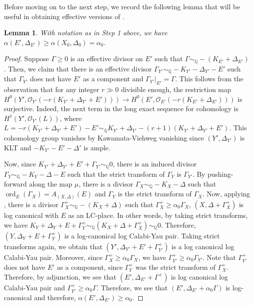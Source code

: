 \documentclass[11pt,reqno]{amsart}
\newcommand{\Q}{\mathbb{Q}}
\newcommand{\cO}{\mathcal{O}}
\DeclareMathOperator{\ord}{ord}
\numberwithin{equation}{section}
\newtheorem{lem}[prop] {Lemma}
\theoremstyle{definition}
\begin{document}
Before moving on to the next step, we record the following lemma that will be useful in obtaining effective versions of .

\begin{lem} \label{lem:alphaofE'}
    With notation as in Step 1 above, we have $\alpha(E', \Delta_{E'}) \geq \alpha (X_0 , \Delta_0) = \alpha_0.$
\end{lem}

\begin{proof}
    Suppose $\Gamma \geq 0$ is an effective divisor on $E'$ such that $\Gamma \sim_\Q - (K_{E'} + \Delta_{E'})$. Then, we claim that there is an effective divisor $\Gamma_{Y'} \sim_{\Q} - K_{Y'} - \Delta_{Y'} - E'$ such that $\Gamma_{Y'}$ does not have $E'$ as a component and $\Gamma_{Y'} |_{E'} = \Gamma $. This follows from the observation that for any integer $r \gg 0$ divisible enough, the restriction map $H^0 (Y', \cO_{Y'} (-r(K_{Y'} + \Delta_{Y'} + E'))) \to H^0 (E', \cO_{E'} (-r(K_{E'} + \Delta_{E'})))  $ is surjective. Indeed, the next term in the long exact sequence for cohomology is $H^1 (Y', \cO_{Y'} (L))$, where $L = -r(K_{Y'} + \Delta_{Y'} + E') - E' \sim_\Q K_{Y'} + \Delta_{Y'} - (r+1) (K_{Y'} + \Delta_{Y'} + E'). $ This cohomology group vanishes by Kawamata-Viehweg vanishing since $(Y', \Delta_{Y'})$ is KLT and $ - K_{Y'} - E' - \Delta'$ is ample.

    Now, since $K_{Y'} + \Delta_{Y'} + E' + \Gamma_{Y'} \sim_ \Q 0$, there is an induced divisor $\Gamma_Y \sim_\Q  -K_Y - \Delta  - E$ such that the strict transform of $\Gamma_Y$ is $\Gamma_{Y'}$. By pushing-forward along the map $\mu$, there is a divisor $\Gamma_X \sim _\Q - K_X - \Delta $ such that $\ord_E (\Gamma_X) = A_{(X, \Delta)} (E)$ and $\Gamma _Y $ is the strict transform of $\Gamma_X$. Now, applying \cite[Lemma~4.9]{LiuXuZhuangHigherrankfinitegeneration}, there is a divisor $\Gamma_X ^+ \sim_\Q -(K_X + \Delta)$ such that $\Gamma_X ^+ \geq \alpha_0 \Gamma_X$, $(X, \Delta + \Gamma_X ^+)$ is log canonical with $E$ as an LC-place. In other words, by taking strict transforms, we have $K_Y + \Delta_Y + E + \Gamma_{Y} ^+ \sim_\Q (K_X +\Delta + \Gamma_X ^+) \sim_\Q 0$. Therefore, $(Y, \Delta_Y + E + \Gamma_Y ^+)$ is a log-canonical log Calabi-Yau pair. Taking strict transforms again, we obtain that $(Y', \Delta_{Y'} + E' + \Gamma_{Y'} ^+)$ is a log canonical log Calabi-Yau pair. Moreover, since $\Gamma _X ^+ \geq \alpha_0 \Gamma_X$, we have $\Gamma_{Y'} ^+ \geq \alpha_0 \Gamma_{Y'}$. Note that $\Gamma_{Y'} ^+$ does not have $E'$ as a component, since $\Gamma_Y ^+$ was the strict transform of $\Gamma_X ^+$. Therefore, by adjunction, we see that $(E', \Delta_{E'} + \Gamma^+)$ is log canonical log Calabi-Yau pair and $\Gamma_{Y'} ^+ \geq \alpha_0 \Gamma$. Therefore, we see that $(E', \Delta_{E'} + \alpha_0 \Gamma)$ is log-canonical and therefore, $\alpha (E', \Delta_{E'}) \geq \alpha_0.$
\end{proof}
\end{document}
